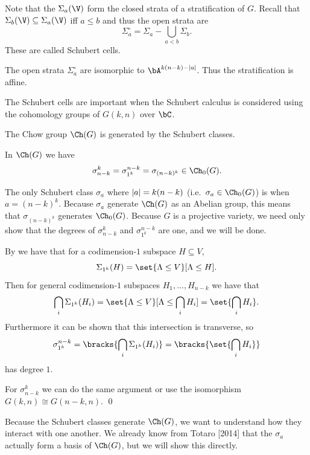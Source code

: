 Note that the $\Sigma_a(\V)$ form the closed strata of a stratification of $G$.
Recall that $\Sigma_b(\V)\subseteq\Sigma_a(\V)$ iff $a\leq b$ and thus the open strata are
$$ \Sigma^\circ_a = \Sigma_a - \bigcup_{a<b}\Sigma_b . $$
These are called {\emphcolor Schubert cells}.

\bprop

    The open strata $\Sigma^\circ_a$ are isomorphic to $\bA^{k(n-k)-\abs a}$.
    Thus the stratification is affine.

\eprop

\bnote

    The Schubert cells are important when the Schubert calculus is considered using the cohomology groups
    of $G(k,n)$ over $\bC$.

\enote

\bcoro

    The Chow group $\Ch(G)$ is generated by the Schubert classes.

\ecoro

\bprop

    In $\Ch(G)$ we have
    $$ \sigma_{n-k}^k = \sigma_{1^k}^{n-k} = \sigma_{(n-k)^k} \in \Ch_0(G) . $$

\eprop

\bproof

    The only Schubert class $\sigma_a$ where $\mathopen{}\mathclose{\left|a\right|}=k(n-k)$ (i.e.\ $\sigma_a\in\Ch_0(G)$) is when
    $a=(n-k)^k$.
    Because $\sigma_a$ generate $\Ch(G)$ as an Abelian group, this means that $\sigma_{(n-k)^k}$ generates
    $\Ch_0(G)$.
    Because $G$ is a projective variety, we need only show that the degrees of $\sigma_{n-k}^k$ and
    $\sigma_{1^k}^{n-k}$ are one, and we will be done.

    By  we have that for a codimension-$1$ subspace $H\subseteq V$,
    $$ \Sigma_{1^k}(H) = \set{\Lambda\leq V}[\Lambda\leq H] . $$
    Then for general codimension-$1$ subspaces $H_1,\dots,H_{n-k}$ we have that
    $$ \bigcap_i\Sigma_{1^k}(H_i) = \set{\Lambda\leq V}[\Lambda\leq\bigcap_iH_i] = \set{\bigcap_iH_i} . $$
    Furthermore it can be shown that this intersection is transverse, so
    $$ \sigma_{1^k}^{n-k} = \bracks{\bigcap_i\Sigma_{1^k}(H_i)} = \bracks{\set{\bigcap_iH_i}} $$
    has degree $1$.

    For $\sigma_{n-k}^k$ we can do the same argument or use the isomorphism $G(k,n)\cong G(n-k,n)$.
    \qed

\eproof

Because the Schubert classes generate $\Ch(G)$, we want to understand how they interact with one another.
We already know from Totaro [2014] that the $\sigma_a$ actually form a basis of $\Ch(G)$, but we will show
this directly.

